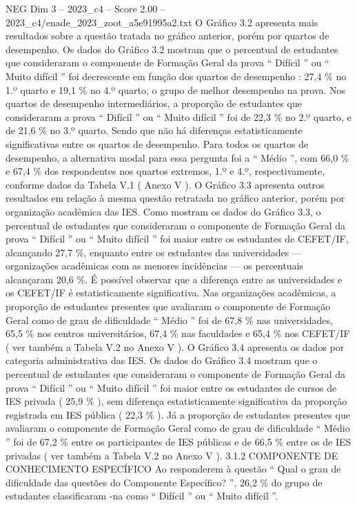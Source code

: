 \begin{textsample}{NEG Dim 3 – 2023\_c4 – Score 2.00 – 2023\_c4/enade\_2023\_zoot\_a5e91995a2.txt}
O Gráfico 3.2 apresenta mais resultados sobre a questão tratada no gráfico anterior, porém por quartos de desempenho.
Os dados do Gráfico 3.2 mostram que o percentual de estudantes que consideraram o componente de Formação Geral da prova “ Difícil ” ou “ Muito difícil ” foi decrescente em função dos quartos de desempenho : 27,4 \% no 1.º quarto e 19,1 \% no 4.º quarto, o grupo de melhor desempenho na prova.
Nos quartos de desempenho intermediários, a proporção de estudantes que consideraram a prova “ Difícil ” ou “ Muito difícil ” foi de 22,3 \% no 2.º quarto, e de 21,6 \% no 3.º quarto.
Sendo que não há diferenças estatisticamente significativas entre os quartos de desempenho.
Para todos os quartos de desempenho, a alternativa modal para essa pergunta foi a “ Médio ”, com 66,0 \% e 67,4 \% dos respondentes nos quartos extremos, 1.º e 4.º, respectivamente, conforme dados da Tabela V.1 ( Anexo V ).
O Gráfico 3.3 apresenta outros resultados em relação à mesma questão retratada no gráfico anterior, porém por organização acadêmica das IES.
Como mostram os dados do Gráfico 3.3, o percentual de estudantes que consideraram o componente de Formação Geral da prova “ Difícil ” ou “ Muito difícil ” foi maior entre os estudantes de CEFET/IF, alcançando 27,7 \%, enquanto entre os estudantes das universidades — organizações acadêmicas com as menores incidências — os percentuais alcançaram 20,6 \%.
É possível observar que a diferença entre as universidades e os CEFET/IF é estatisticamente significativa.
Nas organizações acadêmicas, a proporção de estudantes presentes que avaliaram o componente de Formação Geral como de grau de dificuldade “ Médio ” foi de 67,8 \% nas universidades, 65,5 \% nos centros universitários, 67,4 \% nas faculdades e 65,4 \% nos CEFET/IF ( ver também a Tabela V.2 no Anexo V ).
O Gráfico 3.4 apresenta os dados por categoria administrativa das IES.
Os dados do Gráfico 3.4 mostram que o percentual de estudantes que consideraram o componente de Formação Geral da prova “ Difícil ” ou “ Muito difícil ” foi maior entre os estudantes de cursos de IES privada ( 25,9 \% ), sem diferença estatisticamente significativa da proporção registrada em IES pública ( 22,3 \% ).
Já a proporção de estudantes presentes que avaliaram o componente de Formação Geral como de grau de dificuldade “ Médio ” foi de 67,2 \% entre os participantes de IES públicas e de 66,5 \% entre os de IES privadas ( ver também a Tabela V.2 no Anexo V ). 3.1.2 COMPONENTE DE CONHECIMENTO ESPECÍFICO Ao responderem à questão “ Qual o grau de dificuldade das questões do Componente Específico? ”, 26,2 \% do grupo de estudantes classificaram -na como “ Difícil ” ou “ Muito difícil ”.

\end{textsample}
